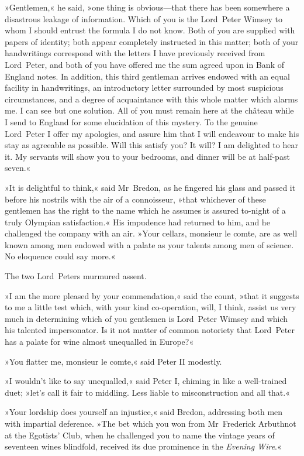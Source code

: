 »Gentlemen,« he said, »one thing is obvious—that there has been somewhere a disastrous leakage of information. Which of you is the Lord~Peter Wimsey to whom I should entrust the formula I do not know. Both of you are supplied with papers of identity; both appear completely instructed in this matter; both of your handwritings correspond with the letters I have previously received from Lord~Peter, and both of you have offered me the sum agreed upon in Bank of England notes. In addition, this third gentleman arrives endowed with an equal facility in handwritings, an introductory letter surrounded by most suspicious circumstances, and a degree of acquaintance with this whole matter which alarms me. I can see but one solution. All of you must remain here at the château while I send to England for some elucidation of this mystery. To the genuine Lord~Peter I offer my apologies, and assure him that I will endeavour to make his stay as agreeable as possible. Will this satisfy you? It will? I am delighted to hear it. My servants will show you to your bedrooms, and dinner will be at half-past seven.«

\divider
»It is delightful to think,« said Mr~Bredon, as he fingered his glass and passed it before his nostrils with the air of a connoisseur, »that whichever of these gentlemen has the right to the name which he assumes is assured to-night of a truly Olympian satisfaction.« His impudence had returned to him, and he challenged the company with an air. »Your cellars, monsieur le comte, are as well known among men endowed with a palate as your talents among men of science. No eloquence could say more.«

The two Lord~Peters murmured assent.

»I am the more pleased by your commendation,« said the count, »that it suggests to me a little test which, with your kind co-operation, will, I think, assist us very much in determining which of you gentlemen is Lord~Peter Wimsey and which his talented impersonator. Is it not matter of common notoriety that Lord~Peter has a palate for wine almost unequalled in Europe?«

»You flatter me, monsieur le comte,« said Peter II modestly.

»I wouldn't like to say unequalled,« said Peter I, chiming in like a well-trained duet; »let's call it fair to middling. Less liable to misconstruction and all that.«

»Your lordship does yourself an injustice,« said Bredon, addressing both men with impartial deference. »The bet which you won from Mr~Frederick Arbuthnot at the Egotists' Club, when he challenged you to name the vintage years of seventeen wines blindfold, received its due prominence in the \textit{Evening Wire}.«

